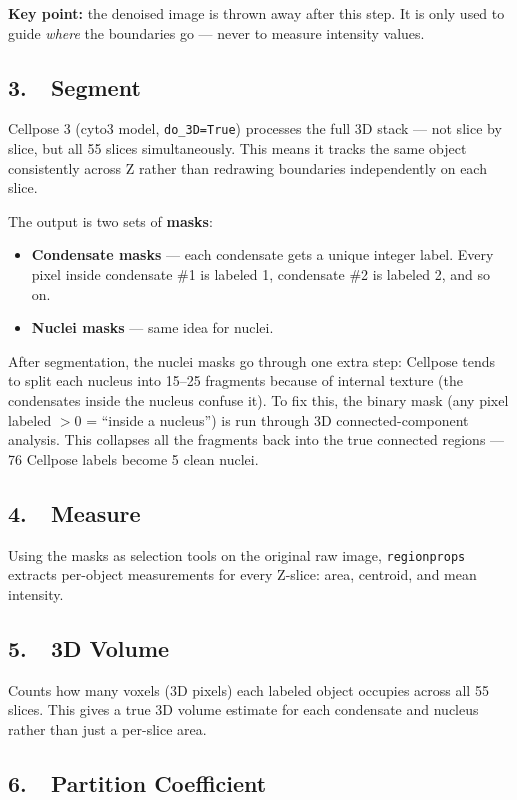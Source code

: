\documentclass[11pt]{article}
\begin{document}
\textbf{Key point:} the denoised image is thrown away after this step. It is only used to guide \textit{where} the boundaries go --- never to measure intensity values.

\subsection*{3.\ \ Segment}
Cellpose 3 (cyto3 model, \texttt{do\_3D=True}) processes the full 3D stack --- not slice by slice, but all 55 slices simultaneously. This means it tracks the same object consistently across Z rather than redrawing boundaries independently on each slice.

The output is two sets of \textbf{masks}:
\begin{itemize}
  \item \textbf{Condensate masks} --- each condensate gets a unique integer label. Every pixel inside condensate \#1 is labeled 1, condensate \#2 is labeled 2, and so on.
  \item \textbf{Nuclei masks} --- same idea for nuclei.
\end{itemize}

After segmentation, the nuclei masks go through one extra step: Cellpose tends to split each nucleus into 15--25 fragments because of internal texture (the condensates inside the nucleus confuse it). To fix this, the binary mask (any pixel labeled $> 0$ = ``inside a nucleus'') is run through 3D connected-component analysis. This collapses all the fragments back into the true connected regions --- 76 Cellpose labels become 5 clean nuclei.

\subsection*{4.\ \ Measure}
Using the masks as selection tools on the original raw image, \texttt{regionprops} extracts per-object measurements for every Z-slice: area, centroid, and mean intensity.

\subsection*{5.\ \ 3D Volume}
Counts how many voxels (3D pixels) each labeled object occupies across all 55 slices. This gives a true 3D volume estimate for each condensate and nucleus rather than just a per-slice area.

\subsection*{6.\ \ Partition Coefficient}
\end{document}
